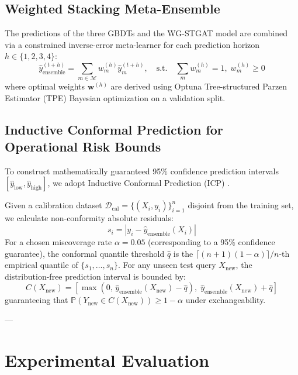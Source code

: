 \documentclass[10pt,journal,compsoc]{IEEEtran}
\begin{document}
\subsection{Weighted Stacking Meta-Ensemble}
The predictions of the three GBDTs and the WG-STGAT model are combined via a constrained inverse-error meta-learner for each prediction horizon $h \in \{1, 2, 3, 4\}$:
\begin{equation}
\hat{y}_{\text{ensemble}}^{(t+h)} = \sum_{m \in \mathcal{M}} w_m^{(h)} \hat{y}_m^{(t+h)}, \quad \text{s.t.} \quad \sum_m w_m^{(h)} = 1, \; w_m^{(h)} \ge 0
\end{equation}
where optimal weights $\mathbf{w}^{(h)}$ are derived using Optuna Tree-structured Parzen Estimator (TPE) Bayesian optimization on a validation split.

\subsection{Inductive Conformal Prediction for Operational Risk Bounds}
To construct mathematically guaranteed 95\% confidence prediction intervals $[\hat{y}_{\text{low}}, \hat{y}_{\text{high}}]$, we adopt Inductive Conformal Prediction (ICP) \cite{vovk2005algorithmic}. 

Given a calibration dataset $\mathcal{D}_{\text{cal}} = \{(X_i, y_i)\}_{i=1}^{n}$ disjoint from the training set, we calculate non-conformity absolute residuals:
\begin{equation}
s_i = \left| y_i - \hat{y}_{\text{ensemble}}(X_i) \right|
\end{equation}
For a chosen miscoverage rate $\alpha = 0.05$ (corresponding to a 95\% confidence guarantee), the conformal quantile threshold $\hat{q}$ is the $\lceil (n+1)(1-\alpha) \rceil / n$-th empirical quantile of $\{s_1, \dots, s_n\}$. For any unseen test query $X_{\text{new}}$, the distribution-free prediction interval is bounded by:
\begin{equation}
C(X_{\text{new}}) = \left[ \max\left(0, \, \hat{y}_{\text{ensemble}}(X_{\text{new}}) - \hat{q}\right), \; \hat{y}_{\text{ensemble}}(X_{\text{new}}) + \hat{q} \right]
\end{equation}
guaranteeing that $\mathbb{P}\left( Y_{\text{new}} \in C(X_{\text{new}}) \right) \ge 1 - \alpha$ under exchangeability.

---

\section{Experimental Evaluation}
\end{document}
